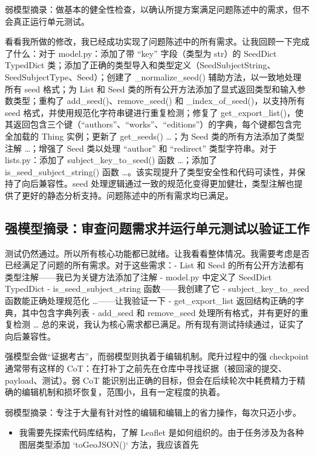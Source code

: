 \documentclass[
  10
]{article}
\providecommand{\tightlist}{%
  \setlength{\itemsep}{0pt}\setlength{\parskip}{0pt}}
\begin{document}
弱模型摘录：做基本的健全性检查，以确认所提方案满足问题陈述中的需求，但不会真正运行单元测试。

看看我所做的修改，我已经成功实现了问题陈述中的所有需求。让我回顾一下完成了什么：对于 model.py：添加了带 ``key'' 字段（类型为 str）的 SeedDict TypedDict 类；添加了正确的类型导入和类型定义（SeedSubjectString、SeedSubjectType、Seed）；创建了 \_normalize\_seed() 辅助方法，以一致地处理所有 seed 格式；为 List 和 Seed 类的所有公开方法添加了显式返回类型和输入参数类型；重构了 add\_seed()、remove\_seed() 和 \_index\_of\_seed()，以支持所有 seed 格式，并使用规范化字符串键进行重复检测；修复了 get\_export\_list()，使其返回包含三个键（``authors''、``works''、``editions''）的字典，每个键都包含完全加载的 Thing 实例；更新了 get\_seeds() \ldots{}；为 Seed 类的所有方法添加了类型注解 \ldots{}；增强了 Seed 类以处理 ``author'' 和 ``redirect'' 类型字符串。对于 lists.py：添加了 subject\_key\_to\_seed() 函数 \ldots{}；添加了 is\_seed\_subject\_string() 函数 \ldots{}。该实现提升了类型安全性和代码可读性，并保持了向后兼容性。seed 处理逻辑通过一致的规范化变得更加健壮，类型注解也提供了更好的静态分析支持。问题陈述中的所有需求均已满足。

\subsection{强模型摘录：审查问题需求并运行单元测试以验证工作}\label{strong-model-excerpt-reviews-problems-requirements-and-runs-unit-tests-to-check-work.}

测试仍然通过。所以所有核心功能都已就绪。让我看看整体情况。我需要考虑是否已经满足了问题的所有需求。对于这些需求：- List 和 Seed 的所有公开方法都有类型注解——我已为关键方法添加了注解 - model.py 中定义了 SeedDict TypedDict - is\_seed\_subject\_string 函数——我创建了它 - subject\_key\_to\_seed 函数能正确处理规范化 \ldots{}——让我验证一下 - get\_export\_list 返回结构正确的字典，其中包含字典列表 - add\_seed 和 remove\_seed 处理所有格式，并有更好的重复检测 \ldots{} 总的来说，我认为核心需求都已满足。所有现有测试持续通过，证实了向后兼容性。

强模型会做``证据考古''，而弱模型则执着于编辑机制。爬升过程中的强 checkpoint 通常带有这样的 CoT：在打补丁之前先在仓库中寻找证据（被回滚的提交、payload、测试）。弱 CoT 能识别出正确的目标，但会在后续轮次中耗费精力于精确的编辑机制和损坏恢复，范围小，且有一定程度的执着。

弱模型摘录：专注于大量有针对性的编辑和编辑上的省力操作，每次只迈小步。

\begin{itemize}
\tightlist
\item
  我需要先探索代码库结构，了解 Leaflet 是如何组织的。由于任务涉及为各种图层类型添加
  `toGeoJSON()` 方法，我应该首先
\end{itemize}
\end{document}
